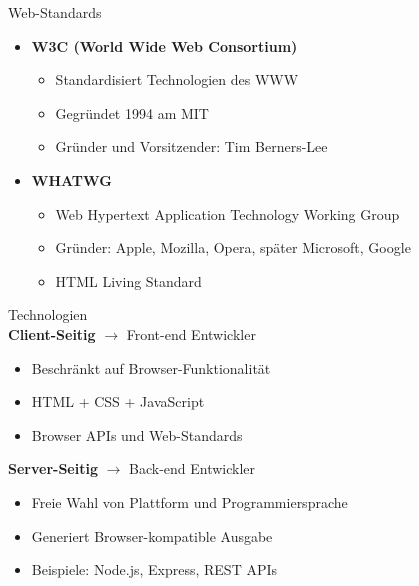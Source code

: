 \begin{theorem}{Web-Standards}
    \begin{itemize}
        \item \textbf{W3C (World Wide Web Consortium)}
            \begin{itemize}
                \item Standardisiert Technologien des WWW
                \item Gegründet 1994 am MIT
                \item Gründer und Vorsitzender: Tim Berners-Lee
            \end{itemize}
        \item \textbf{WHATWG}
            \begin{itemize}
                \item Web Hypertext Application Technology Working Group
                \item Gründer: Apple, Mozilla, Opera, später Microsoft, Google
                \item HTML Living Standard
            \end{itemize}
    \end{itemize}
\end{theorem}

\begin{concept}{Technologien}\\
    \textbf{Client-Seitig} $\rightarrow$ Front-end Entwickler
    \begin{itemize}
        \item Beschränkt auf Browser-Funktionalität
        \item HTML + CSS + JavaScript
        \item Browser APIs und Web-Standards
    \end{itemize}

    \textbf{Server-Seitig} $\rightarrow$ Back-end Entwickler
    \begin{itemize}
        \item Freie Wahl von Plattform und Programmiersprache
        \item Generiert Browser-kompatible Ausgabe
        \item Beispiele: Node.js, Express, REST APIs
    \end{itemize}
\end{concept}

